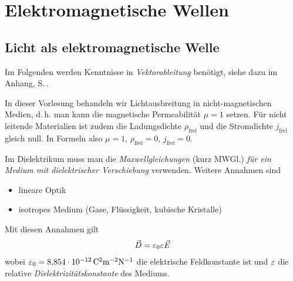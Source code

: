 
\chapter{Elektromagnetische Wellen}
\section{Licht als elektromagnetische Welle}
Im Folgenden werden Kenntnisse in \emph{Vektorableitung} benötigt,
siehe dazu  im Anhang,
S.\,\pageref{vektorableitungen}.

In dieser Vorlesung behandeln wir Lichtausbreitung in
nicht-magnetischen Medien, d.\,h. man kann die 
magnetische Permeabilität $\mu =1$%
setzen. Für nicht leitende Materialien ist zudem die
Ladungsdichte $\rho_\text{frei}$%
und die Stromdichte $j_\text{frei}$%
gleich null. 
In Formeln also $\mu=1$, $\rho_\text{frei}=0$, $j_\text{frei}=0$. 

Im Dielektrikum muss man die \emph{Maxwellgleichungen} (kurz
MWGl.) \emph{für ein Medium mit dielektrischer Verschiebung}%
verwenden.
Weitere Annahmen sind
\begin{itemize}
\item lineare Optik
\item isotropes Medium (Gase, Flüssigkeit, kubische Kristalle)
\end{itemize}
Mit diesen Annahmen gilt
\begin{gather*}
  \vec{D}=\varepsilon_0\varepsilon\vec{E}
\end{gather*}%
%
%
%
%
wobei $\eps_0=\SI{8.854e-12}{\coulomb^2\m^{-2}\newton^{-1}}$
die elektrische Feldkonstante ist und
\emph{$\varepsilon$} die relative \emph{Dielektrizitätskonstante}%
 des Mediums.

